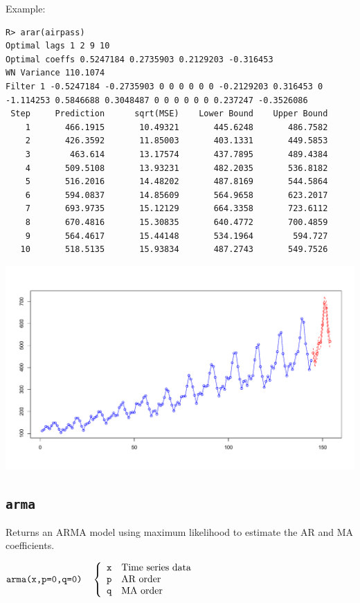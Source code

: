 \documentclass[11pt]{article}
\begin{document}
\noindent
Example:

\begin{verbatim}
R> arar(airpass)
Optimal lags 1 2 9 10 
Optimal coeffs 0.5247184 0.2735903 0.2129203 -0.316453 
WN Variance 110.1074 
Filter 1 -0.5247184 -0.2735903 0 0 0 0 0 0 -0.2129203 0.316453 0
-1.114253 0.5846688 0.3048487 0 0 0 0 0 0 0.237247 -0.3526086 
 Step     Prediction      sqrt(MSE)    Lower Bound    Upper Bound
    1       466.1915       10.49321       445.6248       486.7582
    2       426.3592       11.85003       403.1331       449.5853
    3        463.614       13.17574       437.7895       489.4384
    4       509.5108       13.93231       482.2035       536.8182
    5       516.2016       14.48202       487.8169       544.5864
    6       594.0837       14.85609       564.9658       623.2017
    7       693.9735       15.12129       664.3358       723.6112
    8       670.4816       15.30835       640.4772       700.4859
    9       564.4617       15.44148       534.1964        594.727
   10       518.5135       15.93834       487.2743       549.7526
\end{verbatim}

\begin{center}
\includegraphics[scale=0.3]{Rplot-4.pdf}
\end{center}

\newpage

\subsection{\tt arma}
Returns an ARMA model using maximum likelihood
to estimate the AR and MA coefficients.

\bigskip
$
\hbox{\tt arma(x,p=0,q=0)}\quad\left\{\begin{array}{ll}
{\tt x} & \hbox{Time series data}\\
{\tt p} & \hbox{AR order}\\
{\tt q} & \hbox{MA order}
\end{array}\right.
$
\end{document}
